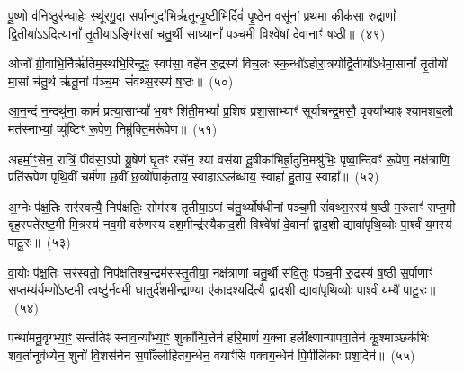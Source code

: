 पू॒ष्णो व॑नि॒ष्ठुर॑न्धा॒हेः स्थू॑रगु॒दा स॒र्पान्गुदा॑भिर्\mbox{}ऋ॒तून्पृ॒ष्टीभि॒र्दिवं॑ पृ॒ष्ठेन॒ वसू॑नां प्रथ॒मा कीक॑सा रु॒द्राणां᳚ द्वि॒तीया॑\-ऽऽदि॒त्यानां᳚ तृ॒तीया\-ऽङ्गि॑रसां चतु॒र्थी सा॒ध्यानां᳚ पञ्च॒मी विश्वे॑षां दे॒वानाꣳ॑ ष॒ष्ठी॥~(४९)\ip

{\anuvakamend[{पू॒ष्णश्चतु॑र्विꣳशतिः}]}%

ओजो᳚ ग्री॒वाभि॒र्निर्\mbox{}ऋ॑तिम॒स्थभि॒रिन्द्र॒ꣴ॒ स्वप॑सा॒ वहे॑न रु॒द्रस्य॑ विच॒लः स्क॒न्धो॑\-ऽहो\-रा॒त्रयो᳚र्द्वि॒तीयो᳚\-ऽर्ध\-मा॒सानां᳚ तृ॒तीयो॑ मा॒सां च॑तु॒र्थ ऋ॑तू॒नां प॑ञ्च॒मः सं॑वथ्स॒रस्य॑ ष॒ष्ठः॥~(५०)\ip

{\anuvakamend[{ओजो॑ विꣳश॒तिः}]}%

आ॒न॒न्दं न॒न्दथु॑ना॒ कामं॑ प्रत्या॒सा\-भ्यां᳚ भ॒यꣳ शि॑ती॒म\-भ्यां᳚ प्र॒शिषं॑ प्रशा॒साभ्याꣳ॑ सूर्याचन्द्र॒मसौ॒ वृक्या᳚भ्याꣴ श्यामशब॒लौ मत॑स्नाभ्यां॒ व्यु॑ष्टिꣳ रू॒पेण॒ निम्रु॑क्ति॒मरू॑पेण॥~(५१)\ip

{\anuvakamend[{आ॒न॒न्दꣳ षोड॑श}]}%

अह॑र्मा॒ꣳ॒सेन॒ रात्रिं॒ पीव॑सा॒\-ऽपो यू॒षेण॑ घृ॒तꣳ रसे॑न॒ श्यां वस॑या दू॒षीका॑भिर्\mbox{}ह्रा॒दुनि॒मश्रु॑भिः॒ पृष्वा॒न्दिवꣳ॑ रू॒पेण॒ नक्ष॑त्राणि॒ प्रति॑रूपेण पृथि॒वीं चर्म॑णा छ॒वीं छ॒व्यो॑पाकृ॑ताय॒ स्वाहा\-ऽऽल॑ब्धाय॒ स्वाहा॑ हु॒ताय॒ स्वाहा᳚॥~(५२)\ip

{\anuvakamend[{अह॑र॒ष्टाविꣳ॑शतिः}]}%

अ॒ग्नेः प॑क्ष॒तिः सर॑स्वत्यै॒ निप॑क्षतिः॒ सोम॑स्य तृ॒तीया॒\-ऽपां च॑तु॒र्थ्योष॑धीनां पञ्च॒मी सं॑वथ्स॒रस्य॑ ष॒ष्ठी म॒रुताꣳ॑ सप्त॒मी बृह॒स्पते॑रष्ट॒मी मि॒त्रस्य॑ नव॒मी वरु॑णस्य दश॒मीन्द्र॑स्यैकाद॒शी विश्वे॑षां दे॒वानां᳚ द्वाद॒शी द्यावा॑पृथि॒व्योः पा॒र्श्वं य॒मस्य॑ पाटू॒रः॥~(५३)\ip

{\anuvakamend[{अ॒ग्नेरेका॒न्नत्रि॒ꣳ॒शत्}]}%

वा॒योः प॑क्ष॒तिः सर॑स्वतो॒ निप॑क्षतिश्च॒न्द्रम॑सस्तृ॒तीया॒ नक्ष॑त्राणां चतु॒र्थी स॑वि॒तुः प॑ञ्च॒मी रु॒द्रस्य॑ ष॒ष्ठी स॒र्पाणाꣳ॑ सप्त॒म्य॑र्य॒म्णो᳚\-ऽष्ट॒मी त्वष्टु॑र्नव॒मी धा॒तुर्द॑श॒मीन्द्रा॒ण्या ए॑काद॒श्यदि॑त्यै द्वाद॒शी द्यावा॑पृथि॒व्योः पा॒र्श्वं य॒म्यै॑ पाटू॒रः॥~(५४)\ip

{\anuvakamend[{वा॒योर॒ष्टाविꣳ॑शतिः}]}%

पन्था॑मनू॒वृग्भ्या॒ꣳ॒ सन्त॑तिꣴ स्नाव॒न्या᳚भ्या॒ꣳ॒ शुका᳚न्पि॒त्तेन॑ हरि॒माणं॑ य॒क्ना हली᳚क्ष्णान्पापवा॒तेन॑ कू॒श्माञ्छक॑भिः शव॒र्तानूव॑ध्येन॒ शुनो॑ वि॒शस॑नेन स॒र्पाँल्लोहितग॒न्धेन॒ वयाꣳ॑सि पक्वग॒न्धेन॑ पि॒पीलि॑काः प्रशा॒देन॑॥~(५५)\ip

{\anuvakamend[{पन्था॒न्द्वाविꣳ॑शतिः}]}%

